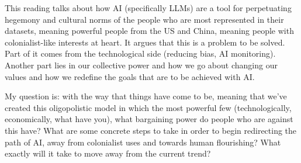 This reading talks about how AI (specifically LLMs) are a tool for perpetuating hegemony and cultural norms of the people who are most represented in their datasets, meaning powerful people from the US and China, meaning people with colonialist-like interests at heart.
It argues that this is a problem to be solved. Part of it comes from the technological side (reducing bias, AI monitoring). 
Another part lies in our collective power and how we go about changing our values and how we redefine the goals that are to be achieved with AI.

My question is: with the way that things have come to be, meaning that we've created this oligopolistic model in which the most powerful few (technologically, economically, what have you), what bargaining power do people who are against this have?
What are some concrete steps to take in order to begin redirecting the path of AI, away from colonialist uses and towards human flourishing?
What exactly will it take to move away from the current trend?